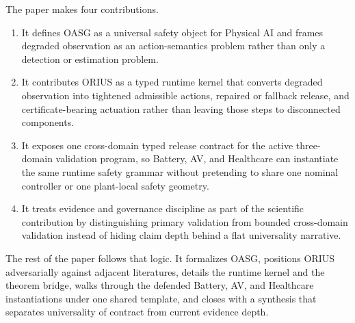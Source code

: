 The paper makes four contributions.
\begin{enumerate}[leftmargin=1.25em,itemsep=0.2em]
\item It defines OASG as a universal safety object for Physical AI and frames degraded
observation as an action-semantics problem rather than only a detection or estimation
problem.
\item It contributes ORIUS as a typed runtime kernel that converts degraded observation
into tightened admissible actions, repaired or fallback release, and certificate-bearing
actuation rather than leaving those steps to disconnected components.
\item It exposes one cross-domain typed release contract for the active three-domain
validation program,
so Battery, AV, and Healthcare can instantiate the same runtime safety grammar without
pretending to share one nominal controller or one plant-local safety geometry.
\item It treats evidence and governance discipline as part of the scientific
contribution by distinguishing primary validation from bounded cross-domain validation
instead of hiding claim depth behind a flat universality narrative.
\end{enumerate}

The rest of the paper follows that logic. It formalizes OASG, positions ORIUS
adversarially against adjacent literatures, details the runtime kernel and the theorem
bridge, walks through the defended Battery, AV, and Healthcare instantiations under one
shared template, and closes with a synthesis that separates universality of contract
from current evidence depth.
